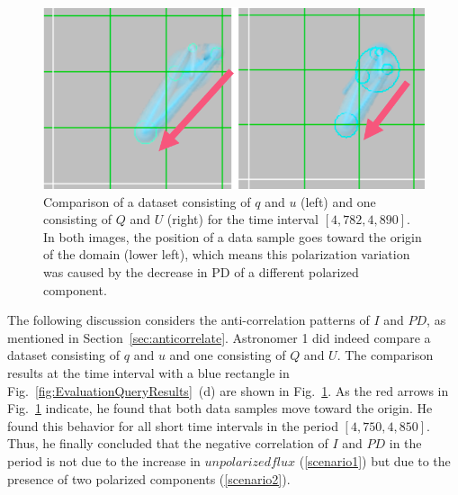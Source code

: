 \begin{figure}[tb]
    \centering
    \includegraphics[width=.8\linewidth]{vgtc_journal_latex/figures/stokesComparisonLabel.png}
    \caption{Comparison of a dataset consisting of $q$ and $u$ (left) and one consisting of $Q$ and $U$ (right) for the time interval $[4{,}782, 4{,}890]$.
    In both images, the position of a data sample goes toward the origin of the domain (lower left), which means this polarization variation was caused by the decrease in PD of a different polarized component.}
    \label{fig:comparisonQIUIvsQU}
\end{figure}

The following discussion considers the anti-correlation patterns of $I$ and $PD$, as mentioned in Section~\ref{sec:anticorrelate}.
Astronomer 1 did indeed compare a dataset consisting of $q$ and $u$ and one consisting of $Q$ and $U$. The comparison results at the time interval with a blue rectangle in Fig.~\ref{fig:EvaluationQueryResults}~(d) are shown in Fig.~\ref{fig:comparisonQIUIvsQU}.
As the red arrows in Fig.~\ref{fig:comparisonQIUIvsQU} indicate, 
he found that both data samples move toward the origin.
He found this behavior for all short time intervals in the period $[4{,}750, 4{,}850]$.
Thus, he finally concluded that the negative correlation of $I$ and $PD$ in the period is not due to the increase in $unpolarized flux$ (\ref{scenario1}) but due to the presence of two polarized components (\ref{scenario2}). 

